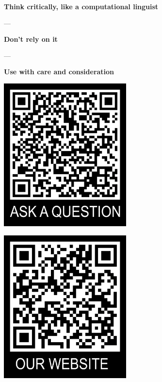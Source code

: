 \documentclass[aspectratio=169,hyperref={unicode}]{beamer}
\begin{document}
\begin{frame}
\begin{center}

\textbf{Think critically, like a computational linguist}

---

\textbf{Don't rely on it}

---

\textbf{Use with care and consideration}


\vspace{1em}

\begin{minipage}{0.4\textwidth}
\centering
    \includegraphics[width=0.5\textwidth]{QRtemplate_5.png}
  \end{minipage}
  \hfill
  \begin{minipage}{0.4\textwidth}
  \centering
    \includegraphics[width=0.5\textwidth]{QRtemplate_4.png}
  \end{minipage}
\end{center}
\end{frame}
\end{document}

